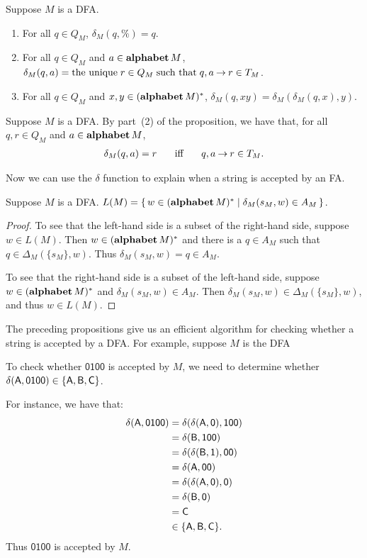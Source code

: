 \begin{proposition}
\label{DetermProp2}
Suppose $M$ is a DFA.
\begin{enumerate}[\quad(1)]
\item For all $q\in Q_M$, $\delta_M(q,\%)={q}$.

\item For all $q\in Q_M$ and $a\in\mathbf{alphabet}\,M$,
$\delta_M(q,a)=\allowbreak\mbox{the unique}\allowbreak\;r\in Q_M\;\allowbreak\mbox{such that}\allowbreak\;
{q,a\mathbin{\to} r\in T_M}$.

\item For all $q\in Q_M$ and $x,y\in(\mathbf{alphabet}\,M)^*$,
$\delta_M(q,xy)={\delta_M(\delta_M(q,x),y)}$.
\end{enumerate}
\end{proposition}

Suppose $M$ is a DFA.  By part~(2) of the proposition, we have that,
for all $q,r\in Q_M$ and $a\in\mathbf{alphabet}\,M$,
\begin{gather*}
\delta_M(q,a)=r\quad\mathrel{\;\;\allowbreak\mbox{iff}\allowbreak\;\;}\quad q,a\mathbin{\to} r\in T_M .
\end{gather*}

Now we can use the $\delta$ function to explain when a string is
accepted by an FA.

\begin{proposition}
\label{DetermProp3}
Suppose $M$ is a DFA.
$L(M)=\{ \, w\in(\mathbf{alphabet}\,M)^* \mid \delta_M(s_M,w)\in A_M \, \}$.
\end{proposition}
\begin{proof}
To see that the left-hand side is a subset of the right-hand side,
suppose $w\in L(M)$.  Then $w\in(\mathbf{alphabet}\,M)^*$ and there is a $q\in A_M$
such that $q\in\Delta_M(\{s_M\},w)$.  Thus $\delta_M(s_M,w)=q\in A_M$.

To see that the right-hand side is a subset of the left-hand side,
suppose $w\in(\mathbf{alphabet}\,M)^*$ and $\delta_M(s_M,w)\in A_M$.  Then
$\delta_M(s_M,w)\in\Delta_M(\{s_M\},w)$, and thus $w\in L(M)$.
\end{proof}

The preceding propositions give us an efficient algorithm for checking
whether a string is accepted by a DFA.  For example, suppose
$M$ is the DFA
\begin{center}

\end{center}
To check whether $\mathsf{0100}$ is accepted by $M$, we need
to determine whether $\delta(\mathsf{A},\mathsf{0100})\in\{\mathsf{A},\mathsf{B},\mathsf{C}\}$.

For instance, we have that:
\begin{align*}
\delta(\mathsf{A},\mathsf{0100})
&= \delta(\delta(\mathsf{A}, \mathsf{0}),\mathsf{100}) \\
&= \delta(\mathsf{B},\mathsf{100}) \\
&= \delta(\delta(\mathsf{B},\mathsf{1}),\mathsf{00}) \\
&= \delta(\mathsf{A},\mathsf{00}) \\
&= \delta(\delta(\mathsf{A},\mathsf{0}),\mathsf{0}) \\
&= \delta(\mathsf{B},\mathsf{0}) \\
&= \mathsf{C} \\
&\in \{\mathsf{A},\mathsf{B},\mathsf{C}\}.
\end{align*}
Thus $\mathsf{0100}$ is accepted by $M$.

